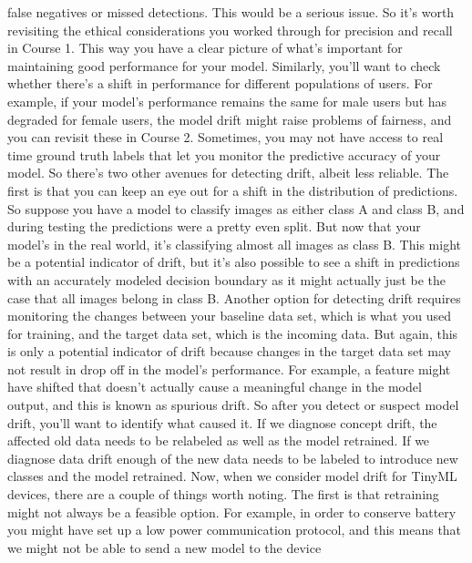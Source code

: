     false negatives or missed detections.
    This would be a serious issue.
    So it's worth revisiting the ethical considerations you worked through
    for precision and recall in Course 1.
    This way you have a clear picture of what's
    important for maintaining good performance for your model.
    Similarly, you'll want to check whether there's a shift in performance
    for different populations of users.
    For example, if your model's performance remains the same for male users
    but has degraded for female users, the model drift
    might raise problems of fairness, and you can revisit these in Course 2.
    Sometimes, you may not have access to real time ground truth
    labels that let you monitor the predictive accuracy of your model.
    So there's two other avenues for detecting drift, albeit less reliable.
    The first is that you can keep an eye out
    for a shift in the distribution of predictions.
    So suppose you have a model to classify images as either class A and class B,
    and during testing the predictions were a pretty even split.
    But now that your model's in the real world,
    it's classifying almost all images as class B. This might
    be a potential indicator of drift, but it's also
    possible to see a shift in predictions with an accurately
    modeled decision boundary as it might actually just
    be the case that all images belong in class B.
    Another option for detecting drift requires
    monitoring the changes between your baseline data
    set, which is what you used for training,
    and the target data set, which is the incoming data.
    But again, this is only a potential indicator of drift
    because changes in the target data set may not result
    in drop off in the model's performance.
    For example, a feature might have shifted that doesn't actually
    cause a meaningful change in the model output,
    and this is known as spurious drift.
    So after you detect or suspect model drift,
    you'll want to identify what caused it.
    If we diagnose concept drift, the affected old data
    needs to be relabeled as well as the model retrained.
    If we diagnose data drift enough of the new data
    needs to be labeled to introduce new classes and the model retrained.
    Now, when we consider model drift for TinyML devices,
    there are a couple of things worth noting.
    The first is that retraining might not always be a feasible option.
    For example, in order to conserve battery
    you might have set up a low power communication protocol,
    and this means that we might not be able to send a new model to the device
